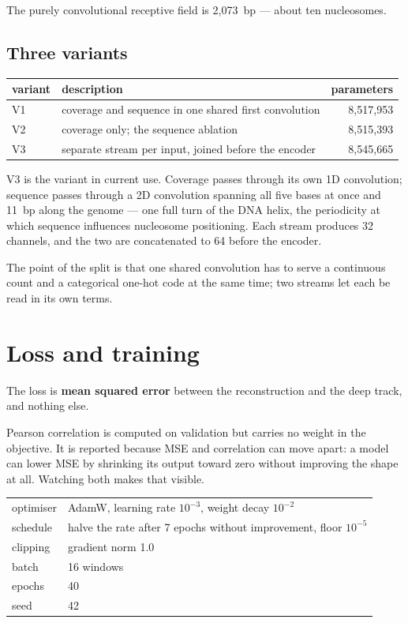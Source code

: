 \documentclass[11pt,a4paper]{article}
\begin{document}
The purely convolutional receptive field is 2{,}073~bp --- about ten nucleosomes.

\subsection{Three variants}

\begin{center}
\begin{tabular}{llr}
\toprule
\textbf{variant} & \textbf{description} & \textbf{parameters} \\
\midrule
V1 & coverage and sequence in one shared first convolution & 8{,}517{,}953 \\
V2 & coverage only; the sequence ablation                  & 8{,}515{,}393 \\
V3 & separate stream per input, joined before the encoder  & 8{,}545{,}665 \\
\bottomrule
\end{tabular}
\end{center}

V3 is the variant in current use. Coverage passes through its own 1D convolution;
sequence passes through a 2D convolution spanning all five bases at once and 11~bp
along the genome --- one full turn of the DNA helix, the periodicity at which
sequence influences nucleosome positioning. Each stream produces 32 channels, and
the two are concatenated to 64 before the encoder.

The point of the split is that one shared convolution has to serve a continuous
count and a categorical one-hot code at the same time; two streams let each be
read in its own terms.

\section{Loss and training}

The loss is \textbf{mean squared error} between the reconstruction and the deep
track, and nothing else.

Pearson correlation is computed on validation but carries no weight in the
objective. It is reported because MSE and correlation can move apart: a model can
lower MSE by shrinking its output toward zero without improving the shape at all.
Watching both makes that visible.

\begin{center}
\begin{tabular}{ll}
\toprule
optimiser & AdamW, learning rate $10^{-3}$, weight decay $10^{-2}$ \\
schedule  & halve the rate after 7 epochs without improvement, floor $10^{-5}$ \\
clipping  & gradient norm 1.0 \\
batch     & 16 windows \\
epochs    & 40 \\
seed      & 42 \\
\bottomrule
\end{tabular}
\end{center}
\end{document}
